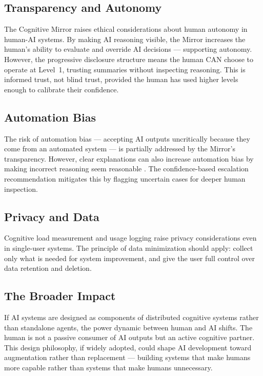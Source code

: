 \documentclass[11pt,a4paper]{article}
\begin{document}
\subsection{Transparency and Autonomy}

The Cognitive Mirror raises ethical considerations about human autonomy in human-AI systems. By making AI reasoning visible, the Mirror increases the human's ability to evaluate and override AI decisions --- supporting autonomy. However, the progressive disclosure structure means the human CAN choose to operate at Level~1, trusting summaries without inspecting reasoning. This is informed trust, not blind trust, provided the human has used higher levels enough to calibrate their confidence.

\subsection{Automation Bias}

The risk of automation bias --- accepting AI outputs uncritically because they come from an automated system --- is partially addressed by the Mirror's transparency. However, clear explanations can also increase automation bias by making incorrect reasoning seem reasonable \citep{bussone2015}. The confidence-based escalation recommendation mitigates this by flagging uncertain cases for deeper human inspection.

\subsection{Privacy and Data}

Cognitive load measurement and usage logging raise privacy considerations even in single-user systems. The principle of data minimization should apply: collect only what is needed for system improvement, and give the user full control over data retention and deletion.

\subsection{The Broader Impact}

If AI systems are designed as components of distributed cognitive systems rather than standalone agents, the power dynamic between human and AI shifts. The human is not a passive consumer of AI outputs but an active cognitive partner. This design philosophy, if widely adopted, could shape AI development toward augmentation rather than replacement --- building systems that make humans more capable rather than systems that make humans unnecessary.
\end{document}
